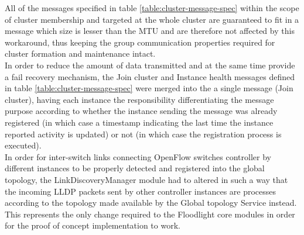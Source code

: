 All of the messages specified in table \ref{table:cluster-message-spec} within the scope of cluster membership and targeted at the whole cluster are guaranteed to fit in a message which size is lesser than the \gls{MTU} and are therefore not affected by this workaround, thus keeping the group communication properties required for cluster formation and maintenance intact.\\
In order to reduce the amount of data transmitted and at the same time provide a fail recovery mechanism, the Join cluster and Instance health messages defined in table \ref{table:cluster-message-spec} were merged into the a single message (Join cluster), having each instance the responsibility differentiating the message purpose according to whether the instance sending the message was already registered (in which case a timestamp indicating the last time the instance reported activity is updated) or not (in which case the registration process is executed).\\
%
In order for inter-switch links connecting OpenFlow switches controller by different instances to be properly detected and registered into the global topology, the LinkDiscoveryManager module had to altered in such a way that the incoming \gls{LLDP} packets sent by other controller instances are processes according to the topology made available by the Global topology Service instead.
This represents the only change required to the Floodlight core modules in order for the proof of concept implementation to work.
%
